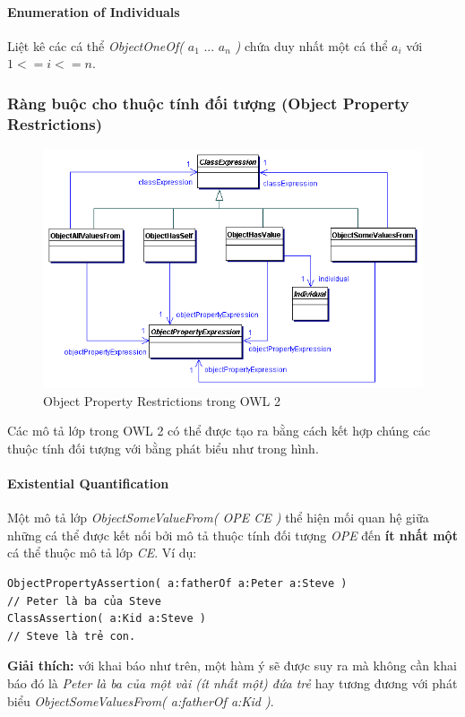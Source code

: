 \paragraph{Enumeration of Individuals} Liệt kê các cá thể \textit{ObjectOneOf(} $a_{1}$ ... $a_{n}$ \textit{)} chứa duy nhất một cá thể $a_{i}$ với $1<=i<=n$. 

\subsubsection{Ràng buộc cho thuộc tính đối tượng (Object Property Restrictions)}
\begin{figure}[h]
	\centering
	\includegraphics[width=150mm]{Figures/ce_1.png}
	\caption{Object Property Restrictions trong OWL 2\label{overflow}}
\end{figure}
Các mô tả lớp trong OWL 2 có thể được tạo ra bằng cách kết hợp chúng các thuộc tính đối tượng với bằng phát biểu như trong hình.
\paragraph{Existential Quantification} Một mô tả lớp \textit{ObjectSomeValueFrom( OPE CE )} thể hiện mối quan hệ giữa những cá thể được kết nối bởi mô tả thuộc tính đối tượng \textit{OPE} đến \textbf{ít nhất một} cá thể thuộc mô tả lớp \textit{CE}. Ví dụ:
\begin{verbatim}
ObjectPropertyAssertion( a:fatherOf a:Peter a:Steve ) 
// Peter là ba của Steve                    
ClassAssertion( a:Kid a:Steve )         
// Steve là trẻ con.
\end{verbatim} 
\textbf{Giải thích:} với khai báo như trên, một hàm ý sẽ được suy ra mà không cần khai báo đó là \textit{Peter là ba của một vài (ít nhất một) đứa trẻ} hay tương đương với phát biểu \textit{ObjectSomeValuesFrom( a:fatherOf a:Kid )}.

